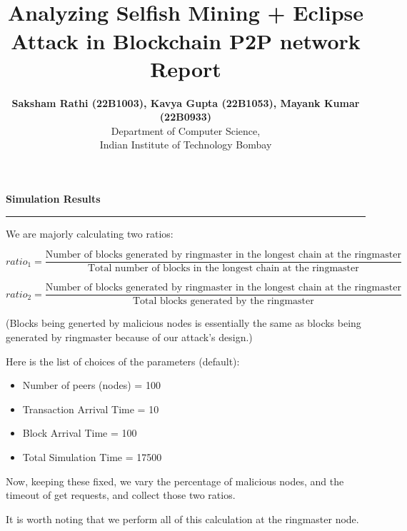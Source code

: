 \documentclass[a4paper,12pt]{article}
\title{\cooltitle{CS765 Project Part-2} \\
\LARGE \textbf{Analyzing Selfish Mining + Eclipse Attack in Blockchain P2P network} \\
{\bf Report}}
\author{{\bf Saksham Rathi (22B1003), Kavya Gupta (22B1053), Mayank Kumar (22B0933)} \\
\small Department of Computer Science, \\
Indian Institute of Technology Bombay \\}
\date{}
\newenvironment{solution}[2][]{%
\begin{mdframed}[linecolor=blue!70!black, linewidth=2pt, roundcorner=10pt, backgroundcolor=yellow!10!white, skipabove=12pt, skipbelow=12pt]%
	\textbf{\large #2}
	\par\noindent\rule{\textwidth}{0.4pt}
}{
\end{mdframed}
}
\begin{document}
\maketitle

\begin{solution}{Simulation Results}
	We are majorly calculating two ratios:

	\[ratio_1 = \frac{\text{Number of blocks generated by ringmaster in the longest chain at the ringmaster}}{\text{Total number of blocks in the longest chain at the ringmaster}}\]

	\[ratio_2 = \frac{\text{Number of blocks generated by ringmaster in the longest chain at the ringmaster}}{\text{Total blocks generated by the ringmaster}}\]


	(Blocks being generted by malicious nodes is essentially the same as blocks being generated by ringmaster because of our attack's design.)

	Here is the list of choices of the parameters (default):

	\begin{itemize}
		\item Number of peers (nodes) = 100
		\item Transaction Arrival Time = 10
		\item Block Arrival Time = 100
		\item Total Simulation Time = 17500
	\end{itemize}

	Now, keeping these fixed, we vary the percentage of malicious nodes, and the timeout of get requests, and collect those two ratios.

	It is worth noting that we perform all of this calculation at the ringmaster node. 
	
\end{solution}
\clearpage
\end{document}
